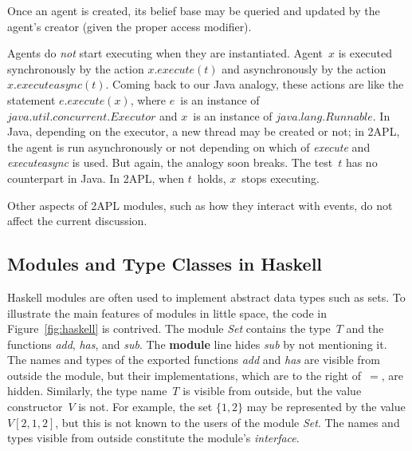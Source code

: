 \documentclass[conference,compsoc]{IEEEtran} %
\begin{document}
Once an agent is created, its belief base may be queried and updated by the
agent's creator (given the proper access modifier).

Agents do \emph{not} start executing when they are instantiated. Agent~$x$
is executed synchronously by the action $x.\mathit{execute}(t)$ and
asynchronously by the action $x.\mathit{executeasync}(t)$. Coming back to
our Java analogy, these actions are like the statement
$e.\mathit{execute}(x)$, where $e$~is an instance of
$\mathit{java}.\mathit{util}.\mathit{concurrent}.\mathit{Executor}$ and
$x$~is an instance of $\mathit{java}.\mathit{lang}.\mathit{Runnable}$.  In
Java, depending on the executor, a new thread may be created or not; in
2APL, the agent is run asynchronously or not depending on which of
\textit{execute} and \textit{executeasync} is used. But again, the analogy
soon breaks. The test~$t$ has no counterpart in Java. In 2APL, when
$t$~holds, $x$~stops executing.

Other aspects of 2APL modules, such as how they interact with 
events, do not affect the current discussion.

\subsection{Modules and Type Classes in Haskell} %


Haskell modules are often used to implement abstract data types such as
sets.  To illustrate the main features of modules in little space, the code
in Figure~\ref{fig:haskell} is contrived.  The module \textit{Set} contains
the type~$T$ and the functions \textit{add}, \textit{has}, and
\textit{sub}. The \textbf{module} line hides \textit{sub} by not mentioning
it. The names and types of the exported functions \textit{add} and
\textit{has} are visible from outside the module, but their
implementations, which are to the right of~$=$, are hidden.  Similarly, the
type name~$T$ is visible from outside, but the value constructor~$V$ is
not. For example, the set $\{1,2\}$ may be represented by the value
$V[2,1,2]$, but this is not known to the users of the module \textit{Set}.
The names and types visible from outside constitute the module's
\emph{interface}.
\end{document}
